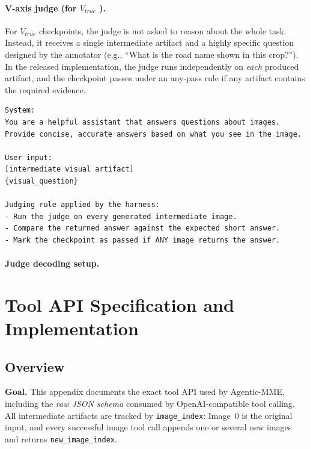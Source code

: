 \documentclass[runningheads]{llncs}
\theoremstyle{plain}
\theoremstyle{definition}
\theoremstyle{remark}
\begin{document}
\paragraph{V-axis judge (for \textbf{$V_{true}$} ).}
For \textbf{$V_{true}$} checkpoints, the judge is not asked to reason about the whole task. Instead, it receives a single intermediate artifact and a highly specific question designed by the annotator (e.g., ``What is the road name shown in this crop?''). In the released implementation, the judge runs independently on \emph{each} produced artifact, and the checkpoint passes under an any-pass rule if any artifact contains the required evidence.

\begin{tcolorbox}[
    enhanced,
    breakable,
    colframe=black!70,
    colback=yellow!5,
    boxrule=1pt, arc=4mm,
    left=2mm, right=2mm, top=1mm, bottom=1mm,
    title={V-axis judge prompt template}
]
\small
\begin{verbatim}
System:
You are a helpful assistant that answers questions about images.
Provide concise, accurate answers based on what you see in the image.

User input:
[intermediate visual artifact]
{visual_question}

Judging rule applied by the harness:
- Run the judge on every generated intermediate image.
- Compare the returned answer against the expected short answer.
- Mark the checkpoint as passed if ANY image returns the answer.
\end{verbatim}
\end{tcolorbox}

\paragraph{Judge decoding setup.}
\section{Tool API Specification and Implementation} 
\label{app:tools} 

\subsection{Overview} 

\begin{tcolorbox}[ 
    enhanced, 
    breakable, 
    colframe=black!70, 
    colback=yellow!5, 
    boxrule=1pt, arc=4mm, 
    left=2mm, right=2mm, top=1mm, bottom=1mm, 
    before=\needspace{6\baselineskip}, 
    title={Overview} 
] 
\noindent\textbf{Goal.} This appendix documents the exact tool API used by Agentic-MME, including the \emph{raw JSON schema} consumed by OpenAI-compatible tool calling. All intermediate artifacts are tracked by \texttt{image\_index}: Image~0 is the original input, and every successful image tool call appends one or several new images and returns \texttt{new\_image\_index}. 
\end{tcolorbox} 
\end{document}
